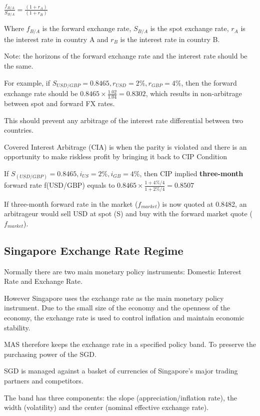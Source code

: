 $\frac{f_{B/A}}{S_{B/A}} = \frac{(1+r_A)}{(1+r_B)}$

Where $f_{B/A}$ is the forward exchange rate, $S_{B/A}$ is the spot exchange rate, $r_A$ is the interest rate in country A and $r_B$ is the interest rate in country B.

Note: the horizons of the forward exchange rate and the interest rate should be the same.

For example, if $S_{USD/GBP} = 0.8465, r_{USD} = 2\%, r_{GBP} = 4\%$, then the forward exchange rate should be $0.8465 \times \frac{1.02}{1.04} = 0.8302$, which results in non-arbitrage between spot and forward FX rates.

This should prevent any arbitrage of the interest rate differential between two countries.

Covered Interest Arbitrage (CIA) is when the parity is violated and there is an opportunity to make riskless profit by bringing it back to CIP Condition

If $S_{(USD/GBP)} = 0.8465, i_{US} = 2\%, i_{GB} = 4\%$, then CIP implied \textbf{three-month} forward rate f(USD/GBP) equals to $0.8465\times\frac{1 + 4\%/4}{1+2\%/4} = 0.8507$

If three-month forward rate in the market ($f_{market}$) is now quoted at 0.8482, an arbitrageur would sell USD at spot (S) and buy with the forward market quote ($f_{market}$).

\subsection{Singapore Exchange Rate Regime}
Normally there are two main monetary policy instruments: Domestic Interest Rate and Exchange Rate.

However Singapore uses the exchange rate as the main monetary policy instrument. Due to the small size of the economy and the openness of the economy, the exchange rate is used to control inflation and maintain economic stability.

MAS therefore keeps the exchange rate in a specified policy band. To preserve the purchasing power of the SGD.

SGD is managed against a basket of currencies of Singapore's major trading partners and competitors.

The band has three components: the slope (appreciation/inflation rate), the width (volatility) and the center (nominal effective exchange rate).


